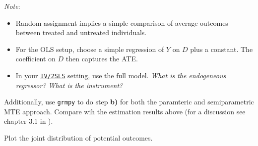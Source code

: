 \begin{boenumerate}
  \textit{Note}: 
  \begin{itemize}
  	\item Random assignment implies a simple comparison of average outcomes between treated and untreated individuals.
  	\item For the OLS setup, choose a simple regression of $Y$ on $D$ plus a constant. The coefficient on $D$ then captures the ATE. 
  	
  	\item In your \href{https://bashtage.github.io/linearmodels/doc/iv/introduction.html}{\texttt{IV/2SLS}} setting, use the full model. \emph{What is the endogeneous regressor? What is the instrument?}
  \end{itemize} 
  
  Additionally, use \texttt{grmpy} to do step \textbf{b)} for both the paramteric and semiparametric MTE approach. Compare wih the estimation results above (for a discussion see chapter 3.1 in \cite{Heckman.2007f}).
  
  \item Plot the joint distribution of potential outcomes.
  

\end{boenumerate}

\nocite{grmpy-1.0}





